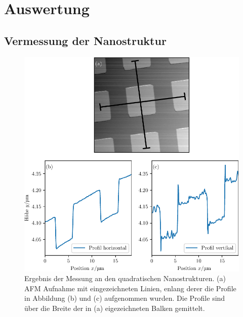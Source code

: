 \section{Auswertung}


\subsection{Vermessung der Nanostruktur}


\begin{figure}
  \centering
  \includegraphics[scale = 1]{../analysis/data/nanostruktur_quadrate/quadrate_profile.pdf}
  \caption{Ergebnis der Messung an den quadratischen Nanostrukturen. (a) AFM Aufnahme mit eingezeichneten
  Linien, enlang derer die Profile in Abbildung (b) und (c) aufgenommen wurden. Die Profile sind
  über die Breite der in (a) eigezeichneten Balken gemittelt.}
  \label{fig: quadrate_profil}
\end{figure}
